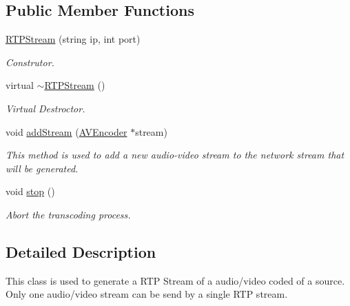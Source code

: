 \subsection*{Public Member Functions}
\begin{DoxyCompactItemize}
\item 
\hyperlink{classbr_1_1ufscar_1_1lince_1_1xpta_1_1streaming_1_1RTPStream_a300274e1616ad400ec01017774036a0d}{RTPStream} (string ip, int port)
\begin{DoxyCompactList}\small\item\em Construtor. \item\end{DoxyCompactList}\item 
virtual \hyperlink{classbr_1_1ufscar_1_1lince_1_1xpta_1_1streaming_1_1RTPStream_a9a30c281b508d24e4e9d877640570951}{$\sim$RTPStream} ()
\begin{DoxyCompactList}\small\item\em Virtual Destroctor. \item\end{DoxyCompactList}\item 
void \hyperlink{classbr_1_1ufscar_1_1lince_1_1xpta_1_1streaming_1_1RTPStream_ae4bab4f526f60b671a2baa9bfeae0189}{addStream} (\hyperlink{classbr_1_1ufscar_1_1lince_1_1xpta_1_1streaming_1_1AVEncoder}{AVEncoder} $\ast$stream)
\begin{DoxyCompactList}\small\item\em This method is used to add a new audio-\/video stream to the network stream that will be generated. \item\end{DoxyCompactList}\item 
void \hyperlink{classbr_1_1ufscar_1_1lince_1_1xpta_1_1streaming_1_1RTPStream_ac5f8339bae0f9a0dbf5068fc78cd2df4}{stop} ()
\begin{DoxyCompactList}\small\item\em Abort the transcoding process. \item\end{DoxyCompactList}\end{DoxyCompactItemize}


\subsection{Detailed Description}
This class is used to generate a RTP Stream of a audio/video coded of a source. Only one audio/video stream can be send by a single RTP stream. 

